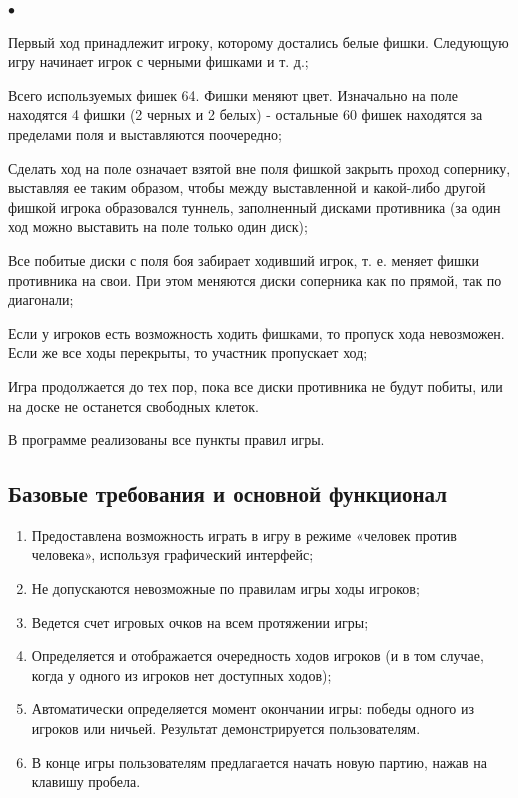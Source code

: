 \documentclass[oneside,final,14pt]{extreport}
\newenvironment{compactlist}{
    \begin{list}
    {{$\bullet$}}
    {
        \setlength\partopsep{0pt}
        \setlength\parskip{0pt}
        \setlength\parsep{5pt}
        \setlength\topsep{5pt}
        \setlength\itemsep{0pt}                        
    }
}{
    \end{list}
}
\begin{document}
\begin{compactlist}
    \item Первый ход принадлежит игроку, которому достались белые фишки. Следующую игру начинает игрок с черными фишками и т. д.;
    \item Всего используемых фишек 64. Фишки меняют цвет. Изначально на поле находятся 4 фишки (2 черных и 2 белых) - остальные 60 фишек находятся за пределами поля и выставляются поочередно;
    \item Сделать ход на поле означает взятой вне поля фишкой закрыть проход сопернику, выставляя ее таким образом, чтобы между выставленной и какой-либо другой фишкой игрока образовался туннель, заполненный дисками противника (за один ход можно выставить на поле только один диск);
    \item Все побитые диски с поля боя забирает ходивший игрок, т. е. меняет фишки противника на свои. При этом меняются диски соперника как по прямой, так по диагонали;
    \item Если у игроков есть возможность ходить фишками, то пропуск хода невозможен. Если же все ходы перекрыты, то участник пропускает ход;
    \item Игра продолжается до тех пор, пока все диски противника не будут побиты, или на доске не останется свободных клеток.
\end{compactlist}
В программе реализованы все пункты правил игры.

\subsection {Базовые требования и основной функционал}
\begin{enumerate}
    \item Предоставлена возможность играть в игру в режиме «человек против человека», используя графический интерфейс;
    \item Не допускаются невозможные по правилам игры ходы игроков;
    \item Ведется счет игровых очков на всем протяжении игры;
    \item Определяется и отображается очередность ходов игроков (и в том случае, когда у одного из игроков нет доступных ходов);
    \item Автоматически определяется момент окончании игры: победы одного из игроков или ничьей. Результат демонстрируется пользователям.
    \item В конце игры пользователям предлагается начать новую партию, нажав на клавишу пробела. 
\end{enumerate}
\end{document}
